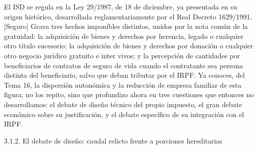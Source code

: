 \documentclass[10pt,a4paper]{article}
\begin{document}
El ISD se regula en la Ley 29/1987, de 18 de diciembre, ya presentada en su origen histórico, desarrollada reglamentariamente por el Real Decreto 1629/1991. [Seguro] Grava tres hechos imponibles distintos, unidos por la nota común de la gratuidad: la adquisición de bienes y derechos por herencia, legado o cualquier otro título sucesorio; la adquisición de bienes y derechos por donación o cualquier otro negocio jurídico gratuito e inter vivos; y la percepción de cantidades por beneficiarios de contratos de seguro de vida cuando el contratante sea persona distinta del beneficiario, salvo que deban tributar por el IRPF. Ya conoces, del Tema 16, la dispersión autonómica y la reducción de empresa familiar de esta figura; no los repito, sino que profundizo ahora en tres cuestiones que entonces no desarrollamos: el debate de diseño técnico del propio impuesto, el gran debate económico sobre su justificación, y el debate específico de su integración con el IRPF.

3.1.2. El debate de diseño: caudal relicto frente a porciones hereditarias
\end{document}
